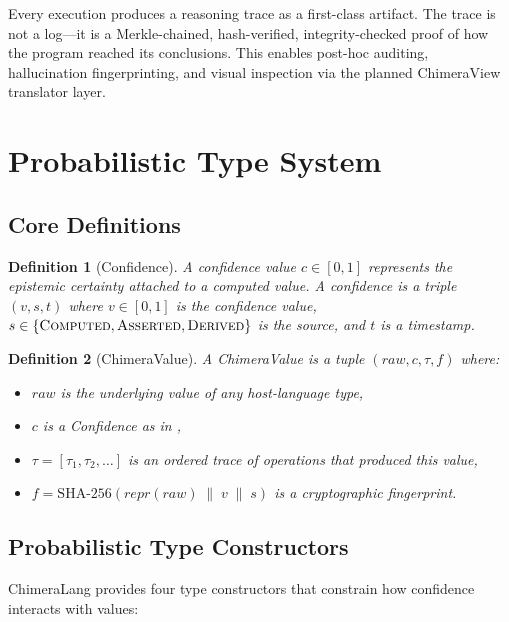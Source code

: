 \documentclass[11pt,a4paper]{article}
\newtheorem{definition}{Definition}[section]
\begin{document}
Every execution produces a reasoning trace as a first-class artifact.
The trace is not a log---it is a Merkle-chained, hash-verified, integrity-checked
proof of how the program reached its conclusions. This enables post-hoc auditing,
hallucination fingerprinting, and visual inspection via the planned ChimeraView
translator layer.

\section{Probabilistic Type System}
\label{sec:typesystem}

\subsection{Core Definitions}

\begin{definition}[Confidence]
\label{def:confidence}
A \emph{confidence value} $c \in [0,1]$ represents the epistemic certainty
attached to a computed value. A confidence is a triple
$(v, s, t)$ where $v \in [0,1]$ is the confidence value,
$s \in \{\textsc{Computed}, \textsc{Asserted}, \textsc{Derived}\}$ is the
source, and $t$ is a timestamp.
\end{definition}

\begin{definition}[ChimeraValue]
\label{def:chimeravalue}
A \emph{ChimeraValue} is a tuple $(\mathit{raw}, c, \tau, f)$ where:
\begin{itemize}[leftmargin=2em]
  \item $\mathit{raw}$ is the underlying value of any host-language type,
  \item $c$ is a \emph{Confidence} as in ,
  \item $\tau = [\tau_1, \tau_2, \ldots]$ is an ordered trace of operations
    that produced this value,
  \item $f = \mathrm{SHA\text{-}256}(\mathit{repr}(\mathit{raw}) \;\|\; v \;\|\; s)$
    is a cryptographic fingerprint.
\end{itemize}
\end{definition}

\subsection{Probabilistic Type Constructors}

ChimeraLang provides four type constructors that constrain how confidence
interacts with values:
\end{document}
